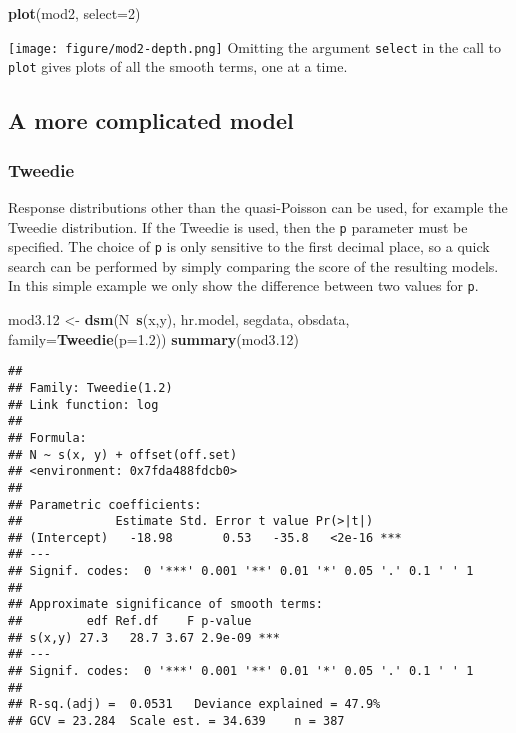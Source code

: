\documentclass[]{article}
\newenvironment{Shaded}{}{}
\newcommand{\KeywordTok}[1]{\textcolor[rgb]{0.00,0.44,0.13}{\textbf{{#1}}}}
\newcommand{\DataTypeTok}[1]{\textcolor[rgb]{0.56,0.13,0.00}{{#1}}}
\newcommand{\DecValTok}[1]{\textcolor[rgb]{0.25,0.63,0.44}{{#1}}}
\newcommand{\FloatTok}[1]{\textcolor[rgb]{0.25,0.63,0.44}{{#1}}}
\newcommand{\StringTok}[1]{\textcolor[rgb]{0.25,0.44,0.63}{{#1}}}
\newcommand{\NormalTok}[1]{{#1}}
\begin{document}
\begin{Shaded}
\begin{Highlighting}[]
\KeywordTok{plot}\NormalTok{(mod2, }\DataTypeTok{select=}\DecValTok{2}\NormalTok{)}
\end{Highlighting}
\end{Shaded}

\texttt{[image: figure/mod2-depth.png]} Omitting the argument
\texttt{select} in the call to \texttt{plot} gives plots of all the
smooth terms, one at a time.

\subsection{A more complicated model}\label{a-more-complicated-model}

\subsubsection{Tweedie}\label{tweedie}

Response distributions other than the quasi-Poisson can be used, for
example the Tweedie distribution. If the Tweedie is used, then the
\texttt{p} parameter must be specified. The choice of \texttt{p} is only
sensitive to the first decimal place, so a quick search can be performed
by simply comparing the score of the resulting models. In this simple
example we only show the difference between two values for \texttt{p}.

\begin{Shaded}
\begin{Highlighting}[]
\NormalTok{mod3}\FloatTok{.12} \NormalTok{<-}\StringTok{ }\KeywordTok{dsm}\NormalTok{(N~}\KeywordTok{s}\NormalTok{(x,y), hr.model, segdata, obsdata,}
            \DataTypeTok{family=}\KeywordTok{Tweedie}\NormalTok{(}\DataTypeTok{p=}\FloatTok{1.2}\NormalTok{))}
\KeywordTok{summary}\NormalTok{(mod3}\FloatTok{.12}\NormalTok{)}
\end{Highlighting}
\end{Shaded}

\begin{verbatim}
## 
## Family: Tweedie(1.2) 
## Link function: log 
## 
## Formula:
## N ~ s(x, y) + offset(off.set)
## <environment: 0x7fda488fdcb0>
## 
## Parametric coefficients:
##             Estimate Std. Error t value Pr(>|t|)    
## (Intercept)   -18.98       0.53   -35.8   <2e-16 ***
## ---
## Signif. codes:  0 '***' 0.001 '**' 0.01 '*' 0.05 '.' 0.1 ' ' 1
## 
## Approximate significance of smooth terms:
##         edf Ref.df    F p-value    
## s(x,y) 27.3   28.7 3.67 2.9e-09 ***
## ---
## Signif. codes:  0 '***' 0.001 '**' 0.01 '*' 0.05 '.' 0.1 ' ' 1
## 
## R-sq.(adj) =  0.0531   Deviance explained = 47.9%
## GCV = 23.284  Scale est. = 34.639    n = 387
\end{verbatim}
\end{document}
